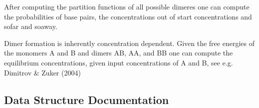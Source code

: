 After computing the partition functions of all possible dimeres one can compute the probabilities of base pairs, the concentrations out of start concentrations and sofar and soaway.

Dimer formation is inherently concentration dependent. Given the free energies of the monomers A and B and dimers AB, AA, and BB one can compute the equilibrium concentrations, given input concentrations of A and B, see e.\+g. Dimitrov \& Zuker (2004) 

\subsection{Data Structure Documentation}
\label{structvrna__dimer__pf__s}
